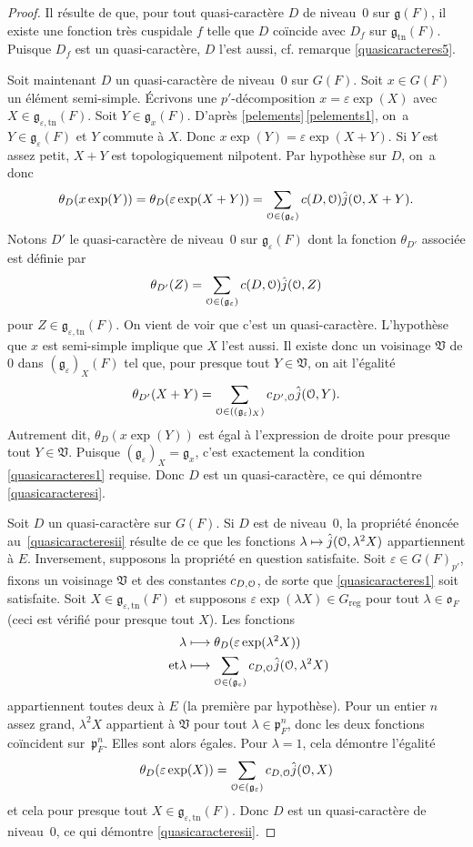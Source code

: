 \documentclass[11pt]{article}
\newcommand{\cf}{cf.\xspace}
\numberwithin{equation}{section}\providecommand{\og}{«\,}\providecommand{\fg}{\,»}
\let\mathcal \EuScript
\newcommand{\NoChangel}[1]{%
\expandafter\let\csname old\string#1\endcsname=#1
\let#1=\relax
\newcommand{#1}{\mathcode`l="716C\csname old\string#1\endcsname\mathcode`l="7160 }%
}
\let\epsilon\varepsilon
\newcommand\mto{\mathchoice{\longmapsto}{\mapsto}{\mapsto}{\mapsto}}
\newcommand{\frg}{\mathfrak{g}}
\newcommand{\fro}{\mathfrak{o}}
\newcommand{\frp}{\mathfrak{p}}
\newcommand{\frV}{\mathfrak{V}}
\newcommand{\Nil}{\mathrm{Nil}} \NoChangel{\Nil}
\newcommand{\reg}{\mathrm{reg}}
\newcommand{\tn}{\mathrm{tn}}
\newcommand{\cO}{\mathcal{O}}
\theoremstyle{plain}
\theoremstyle{definition}
\begin{document}
\begin{proof}
Il résulte de \cite[Lem.\,6.3(iii)]{W1} que, pour tout quasi-caractère $D$ de niveau~$0$ sur $\frg(F)$, il existe une fonction très cuspidale $f$ telle que $D$ coïncide avec $D_{f}$ sur $\frg_{\tn}(F)$. Puisque $D_{f}$ est un quasi-caractère, $D$ l'est aussi, \cf remarque \eqref{quasicaracteres5}.

Soit maintenant $D$ un quasi-caractère de niveau~$0$ sur $G(F)$. Soit $x\in G(F)$ un élément semi-simple. Écrivons une $p'$-décomposition $x=\epsilon \exp(X)$ avec $X\in \frg_{\epsilon,\tn}(F)$. Soit $Y\in \frg_{x}(F)$. D'après \ref{pelements}\,\eqref{pelements1}, on~a $Y\in \frg_{\epsilon}(F)$ et $Y$ commute à $X$. Donc $x\exp(Y)=\epsilon \exp(X+Y)$. Si $Y$ est assez petit, $X+Y$ est topologiquement nilpotent. Par hypothèse sur $D$, on~a donc
\[
\theta_{D}(x \exp(Y))=\theta_{D}(\epsilon \exp(X+Y))=\sum_{\cO\in \Nil(\frg_{\epsilon})}c(D,\cO)\hat{j}(\cO,X+Y).
\]
Notons $D'$ le quasi-caractère de niveau~$0$ sur $\frg_{\epsilon}(F)$ dont la fonction $\theta_{D'}$ associée est définie par
\[
\theta_{D'}(Z)= \sum_{\cO\in \Nil(\frg_{\epsilon})}c(D,\cO)\hat{j}(\cO,Z)
\]
pour $Z\in \frg_{\epsilon,\tn}(F)$. On vient de voir que c'est un quasi-caractère. L'hypothèse que $x$ est semi-simple implique que $X$ l'est aussi. Il existe donc un voisinage $\frV$ de $0$ dans $(\frg_{\epsilon})_{X}(F)$ tel que, pour presque tout $Y\in \frV$, on ait l'égalité
\[
\theta_{D'}(X+Y)=\sum_{\cO\in \Nil((\frg_{\epsilon})_{X})}c_{D',\cO}\hat{j}(\cO,Y).
\]
Autrement dit, $\theta_{D}(x \exp(Y))$ est égal à l'expression de droite pour presque tout \hbox{$Y\!\in\!\frV$}. Puisque $(\frg_{\epsilon})_{X}=\frg_{x}$, c'est exactement la condition \eqref{quasicaracteres1} requise. Donc $D$ est un quasi-caractère, ce qui démontre \eqref{quasicaracteresi}.

Soit $D$ un quasi-caractère sur $G(F)$. Si $D$ est de niveau~$0$, la propriété énoncée au~\eqref{quasicaracteresii} résulte de ce que les fonctions $\lambda\mto \hat{j}(\cO,\lambda^2X)$ appartiennent à $E$. Inversement, supposons la propriété en question satisfaite. Soit $\epsilon\in G(F)_{p'}$, fixons un voisinage $\frV$ et des constantes $c_{D,\cO}$, de sorte que \eqref{quasicaracteres1} soit satisfaite. Soit $X\in \frg_{\epsilon,\tn}(F)$ et supposons $\epsilon \exp(\lambda X)\in G_{\reg}$ pour tout $\lambda\in \fro_{F}$ (ceci est vérifié pour presque tout $X$). Les fonctions
\begin{align*}
\lambda&\mto \theta_{D}(\epsilon \exp(\lambda^2X))
\\
\tag*{et}
\lambda&\mto \sum_{\cO\in \Nil(\frg_{\epsilon})}c_{D,\cO}\hat{j}(\cO,\lambda^2X)
\end{align*}
appartiennent toutes deux à $E$ (la première par hypothèse). Pour un entier $n$ assez grand, $\lambda^2 X$ appartient à $\frV$ pour tout $\lambda\in \frp_{F}^n$, donc les deux fonctions coïncident sur~$\frp_{F}^n$. Elles sont alors égales. Pour $\lambda=1$, cela démontre l'égalité
\[
\theta_{D}(\epsilon \exp(X))=\sum_{\cO\in \Nil(\frg_{\epsilon})}c_{D,\cO}\hat{j}(\cO,X)
\]
et cela pour presque tout $X\in \frg_{\epsilon,\tn}(F)$. Donc $D$ est un quasi-caractère de niveau~$0$, ce qui démontre \eqref{quasicaracteresii}.


\end{proof}
\end{document}
